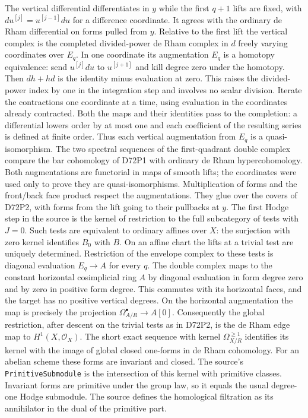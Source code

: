 The vertical differential differentiates in $y$ while the first
$q+1$ lifts are fixed, with $d u^{[j]}=u^{[j-1]}du$ for a difference
coordinate. It agrees with the ordinary de Rham differential on
forms pulled from $y$. Relative to the first lift the vertical complex
is the completed divided-power de Rham complex in $d$ freely varying
coordinates over $E_q$. In one coordinate its augmentation $E_q$ is
a homotopy equivalence: send $u^{[j]}du$ to $u^{[j+1]}$ and kill
degree zero under the homotopy. Then $dh+hd$ is the identity
minus evaluation at zero. This raises the divided-power index by
one in the integration step and involves no scalar division.
Iterate the contractions one coordinate at a time, using evaluation
in the coordinates already contracted. Both the maps and their
identities pass to the completion: a differential lowers order by
at most one and each coefficient of the resulting series is defined
at finite order. Thus each vertical augmentation from $E_q$ is a
quasi-isomorphism. The two spectral sequences of the first-quadrant
double complex compare the bar cohomology of D72P1 with ordinary
de Rham hypercohomology. Both augmentations are functorial in maps of
smooth lifts; the coordinates were used only to prove they are
quasi-isomorphisms. Multiplication of forms and the front/back
face product respect the augmentations. They glue over the covers of
D72P2, with forms from the lift going to their pullbacks at $y$.
The first Hodge step in the source is the kernel of restriction to
the full subcategory of tests with $J=0$. Such tests are equivalent
to ordinary affines over $X$: the surjection with zero kernel
identifies $B_0$ with $B$. On an affine chart the lifts at a trivial
test are uniquely determined. Restriction of the envelope complex
to these tests is diagonal evaluation $E_q\to A$ for every $q$.
The double complex maps to the constant horizontal cosimplicial ring
$A$ by diagonal evaluation in form degree zero and by zero in positive
form degree. This commutes with its horizontal faces, and the target
has no positive vertical degrees. On the horizontal augmentation the
map is precisely the projection $\Omega^\bullet_{A/R}\to A[0]$.
Consequently the global restriction, after descent on the trivial tests
as in D72P2, is the de Rham edge map to $H^1(X,\mathcal O_X)$.
The short exact sequence with kernel $\Omega^{\ge1}_{X/R}$ identifies
its kernel with the image of global closed one-forms in de Rham
cohomology. For an abelian scheme these forms are invariant and
closed. The source's \texttt{PrimitiveSubmodule} is the intersection
of this kernel with primitive classes. Invariant forms are primitive
under the group law, so it equals the usual degree-one Hodge
submodule. The source defines the homological filtration as its
annihilator in the dual of the primitive part.

